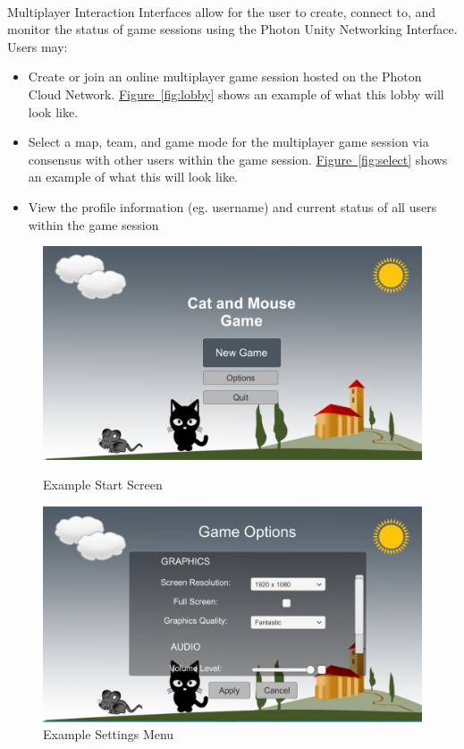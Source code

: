 \documentclass[12pt, titlepage]{article}
\begin{document}
\paragraph{} Multiplayer Interaction Interfaces allow for the user to create, connect to, and monitor the status of game sessions using the Photon Unity Networking Interface. Users may:
\begin{itemize}
    \item Create or join an online multiplayer game session hosted on the Photon Cloud Network. \hyperref[fig:lobby]{Figure~\ref*{fig:lobby}} shows an example of what this lobby will look like. 
    \item Select a map, team, and game mode for the multiplayer game session via consensus with other users within the game session. \hyperref[fig:select]{Figure~\ref*{fig:select}} shows an example of what this will look like. 
    \item View the profile information (eg. username) and current status of all users within the game session
\end{itemize}
\begin{figure}
    \centering
    \includegraphics[width=1.00\textwidth]{menu}
    \caption{Example Start Screen}
    \label{fig:menu}
    \centering
    \includegraphics[width=1.00\textwidth]{settings}
    \caption{Example Settings Menu}
    \label{fig:settings}
\end{figure}
\end{document}
